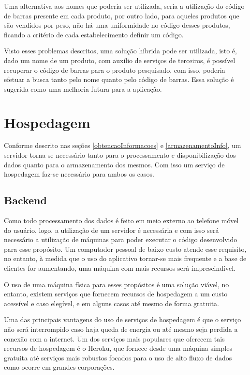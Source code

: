 Uma alternativa aos nomes que poderia ser utilizada, seria a utilização do código de barras presente em cada produto, por outro lado, para aqueles produtos que são vendidos por peso, não há uma uniformidade no código desses produtos, ficando a critério de cada estabelecimento definir um código.

Visto esses problemas descritos, uma solução híbrida pode ser utilizada, isto é, dado um nome de um produto, com auxílio de serviços de terceiros, é possível recuperar o código de barras para o produto pesquisado, com isso, poderia efetuar a busca tanto pelo nome quanto pelo código de barras. Essa solução é sugerida como uma melhoria futura para a aplicação.

\section{Hospedagem}

Conforme descrito nas seções \ref{obtencaoInformacoes} e \ref{armazenamentoInfo}, um servidor torna-se necessário tanto para o processamento e disponibilização dos dados quanto para o armazenamento dos mesmos. Com isso um serviço de hospedagem faz-se necessário para ambos os casos.

\subsection{Backend}

Como todo processamento dos dados é feito em meio externo ao telefone móvel do usuário, logo, a utilização de um servidor é necessária e com isso será necessário a utilização de máquinas para poder executar o código desenvolvido para esse propósito. Um computador pessoal de baixo custo atende esse requisito, no entanto, à medida que o uso do aplicativo tornar-se mais frequente e a base de clientes for aumentando, uma máquina com mais recursos será imprescindível.

O uso de uma máquina física para esses propósitos é uma solução viável, no entanto, existem serviços que fornecem recursos de hospedagem a um custo acessível e caso elegível, e em alguns casos até mesmo de forma gratuita.

Uma das principais vantagens do uso de serviços de hospedagem é que o serviço não será interrompido caso haja queda de energia ou até mesmo seja perdida a conexão com a internet. Um dos serviços mais populares que oferecem tais recursos de hospedagem é o Heroku\cite{heroku}, que fornece desde uma máquina simples gratuita até serviços mais robustos focados para o uso de alto fluxo de dados como ocorre em grandes corporações.

